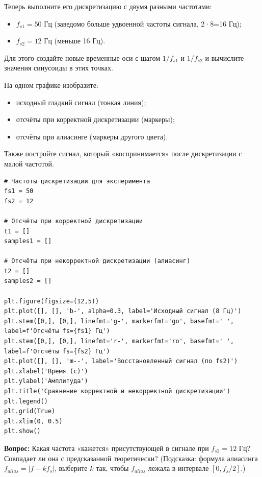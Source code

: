 \documentclass[12pt,a4paper,openany]{book}
\providecommand{\tightlist}{\setlength{\itemsep}{0pt}\setlength{\parskip}{0pt}}
\begin{document}
Теперь выполните его дискретизацию с двумя разными частотами:

\begin{itemize}
\tightlist
\item
  \(f_{s1} = 50\) Гц (заведомо больше удвоенной частоты сигнала, 2·8=16 Гц);
\item
  \(f_{s2} = 12\) Гц (меньше 16 Гц).
\end{itemize}

Для этого создайте новые временные оси с шагом \(1/f_{s1}\) и \(1/f_{s2}\) и вычислите значения синусоиды в этих точках.

На одном графике изобразите:

\begin{itemize}
\tightlist
\item
  исходный гладкий сигнал (тонкая линия);
\item
  отсчёты при корректной дискретизации (маркеры);
\item
  отсчёты при алиасинге (маркеры другого цвета).
\end{itemize}

Также постройте сигнал, который «воспринимается» после дискретизации с малой частотой.

\begin{Verbatim}[fontsize=\small, breaklines, breakanywhere, frame=single, framesep=2mm]
# Частоты дискретизации для эксперимента
fs1 = 50
fs2 = 12

# Отсчёты при корректной дискретизации
t1 = []
samples1 = []

# Отсчёты при некорректной дискретизации (алиасинг)
t2 = []
samples2 = []

plt.figure(figsize=(12,5))
plt.plot([], [], 'b-', alpha=0.3, label='Исходный сигнал (8 Гц)')
plt.stem([0,], [0,], linefmt='g-', markerfmt='go', basefmt=' ', label=f'Отсчёты fs={fs1} Гц')
plt.stem([0,], [0,], linefmt='r-', markerfmt='ro', basefmt=' ', label=f'Отсчёты fs={fs2} Гц')
plt.plot([], [], 'm--', label='Восстановленный сигнал (по fs2)')
plt.xlabel('Время (с)')
plt.ylabel('Амплитуда')
plt.title('Сравнение корректной и некорректной дискретизации')
plt.legend()
plt.grid(True)
plt.xlim(0, 0.5)
plt.show()
\end{Verbatim}

\textbf{Вопрос:} Какая частота «кажется» присутствующей в сигнале при \(f_{s2}=12\) Гц? Совпадает ли она с предсказанной теоретически? (Подсказка: формула алиасинга \(f_{alias} = |f - k f_s|\), выберите \(k\) так, чтобы \(f_{alias}\) лежала в интервале \([0, f_s/2]\).)
\end{document}
